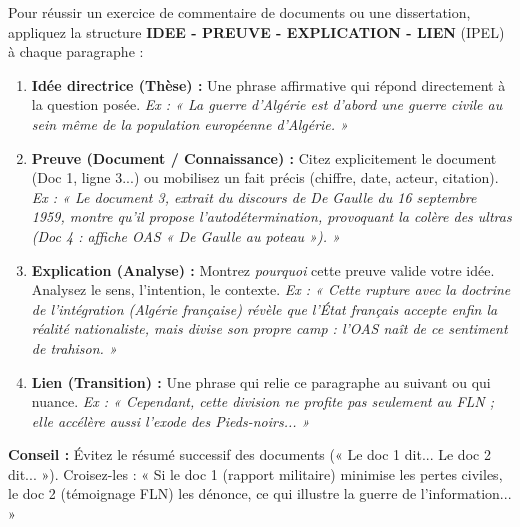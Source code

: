 \documentclass[11pt]{article}
\begin{document}
\begin{methode}
Pour réussir un exercice de commentaire de documents ou une dissertation, appliquez la structure \textbf{IDEE - PREUVE - EXPLICATION - LIEN} (IPEL) à chaque paragraphe :
\begin{enumerate}
    \item \textbf{Idée directrice (Thèse) :} Une phrase affirmative qui répond directement à la question posée. \emph{Ex : « La guerre d'Algérie est d'abord une guerre civile au sein même de la population européenne d'Algérie. »}
    \item \textbf{Preuve (Document / Connaissance) :} Citez explicitement le document (Doc 1, ligne 3...) ou mobilisez un fait précis (chiffre, date, acteur, citation). \emph{Ex : « Le document 3, extrait du discours de De Gaulle du 16 septembre 1959, montre qu'il propose l'autodétermination, provoquant la colère des ultras (Doc 4 : affiche OAS « De Gaulle au poteau »). »}
    \item \textbf{Explication (Analyse) :} Montrez \emph{pourquoi} cette preuve valide votre idée. Analysez le sens, l'intention, le contexte. \emph{Ex : « Cette rupture avec la doctrine de l'intégration (Algérie française) révèle que l'État français accepte enfin la réalité nationaliste, mais divise son propre camp : l'OAS naît de ce sentiment de trahison. »}
    \item \textbf{Lien (Transition) :} Une phrase qui relie ce paragraphe au suivant ou qui nuance. \emph{Ex : « Cependant, cette division ne profite pas seulement au FLN ; elle accélère aussi l'exode des Pieds-noirs... »}
\end{enumerate}
\textbf{Conseil :} Évitez le résumé successif des documents (« Le doc 1 dit... Le doc 2 dit... »). Croisez-les : « Si le doc 1 (rapport militaire) minimise les pertes civiles, le doc 2 (témoignage FLN) les dénonce, ce qui illustre la guerre de l'information... »
\end{methode}
\end{document}
